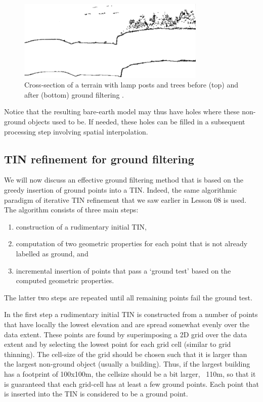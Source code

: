 \begin{figure}[htb]
  \centering
  \includegraphics[width=0.8\textwidth]{figs/axelsson-profiles.png}
  \caption{Cross-section of a terrain with lamp posts and trees before (top) and after (bottom) ground filtering \citep{axelsson2000generation}.}
 \label{fig:axelsson:profiles}
\end{figure}

Notice that the resulting bare-earth model may thus have holes where these non-ground objects used to be.
If needed, these holes can be filled in a subsequent processing step involving spatial interpolation.

\subsection{TIN refinement for ground filtering}
We will now discuss an effective ground filtering method that is based on the greedy insertion of ground points into a TIN\@.
Indeed, the same algorithmic paradigm of iterative TIN refinement that we saw earlier in Lesson 08 is used.
The algorithm consists of three main steps:
\begin{enumerate}
  \item construction of a rudimentary initial TIN,
  \item computation of two geometric properties for each point that is not already labelled as ground, and
  \item incremental insertion of points that pass a `ground test' based on the computed geometric properties.
\end{enumerate}
The latter two steps are repeated until all remaining points fail the ground test.

In the first step a rudimentary initial TIN is constructed from a number of points that have locally the lowest elevation and are spread somewhat evenly over the data extent.
These points are found by superimposing a 2D grid over the data extent and by selecting the lowest point for each grid cell (similar to grid thinning).
The cell-size of the grid should be chosen such that it is larger than the largest non-ground object (usually a building).
Thus, if the largest building has a footprint of 100x100m, the cellsize should be a bit larger, \eg\ 110m, so that it is guaranteed that each grid-cell has at least a few ground points.
Each point that is inserted into the TIN is considered to be a ground point.

